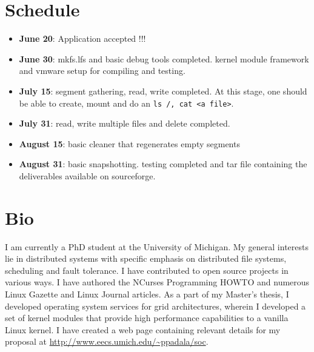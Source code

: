 \documentclass{article}
\begin{document}
\section{Schedule}
\begin{itemize}
\item
\textbf{June 20}: Application accepted !!!
\item
\textbf{June 30}: mkfs.lfs and basic debug tools completed. kernel module
framework and vmware setup for compiling and testing.
\item
\textbf{July 15}: segment gathering, read, write completed. At this stage, one
should be able to create, mount and do an \texttt{ls /, cat <a file>}.
\item
\textbf{July 31}: read, write multiple files and delete completed.
\item
\textbf{August 15}: basic cleaner that regenerates empty segments
\item
\textbf{August 31}: basic snapshotting. testing completed and tar file 
containing the deliverables available on sourceforge.
\end{itemize}

\section{Bio} 
I am currently a PhD student at the University of Michigan. My general
interests lie in distributed systems with specific emphasis on distributed
file systems, scheduling and fault tolerance. I have contributed to open
source projects in various ways. I have authored the NCurses Programming
HOWTO and numerous Linux Gazette and Linux Journal articles. As a part
of my Master's thesis, I developed operating system services for grid
architectures, wherein I developed a set of kernel modules that provide high
performance capabilities to a vanilla Linux kernel. I have created a web page
containing relevant details for my proposal at
\url{http://www.eecs.umich.edu/~ppadala/soc}. 



\end{document}
